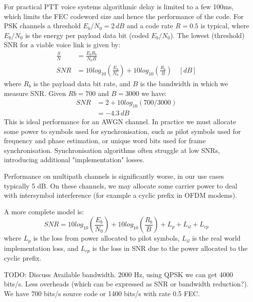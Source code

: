 \documentclass{article}
\begin{document}
For practical PTT voice systems algorithmic delay is limited to a few 100ms, which limits the FEC codeword size and hence the performance of the code.  For PSK channels a threshold $E_b/N_0=2 \, \si{dB}$ and a code rate $R=0.5$ is typical, where $E_b/N_0$ is the energy per payload data bit (coded $E_b/N_0$).  The lowest (threshold) SNR for a viable voice link is given by:
\begin{equation}
\label{eq:snr}
\begin{split}
\frac{S}{N} &= \frac{E_bR_b}{N_0B} \\
SNR &= 10log_{10}\left(\frac{E_b}{N_0}\right) + 10log_{10}\left(\frac{R_b}{B}\right) \quad [\si{dB}]
\end{split}
\end{equation}
where $R_b$ is the payload data bit rate, and $B$ is the bandwidth in which we measure SNR.  Given $Rb=700$ and $B=3000$ we have:
\begin{equation}
\begin{split}
SNR &= 2 + 10log_{10}(700/3000) \\
    &= -4.3 \, \si{dB}
\end{split}
\end{equation}
This is ideal performance for an AWGN channel.  In practice we must allocate some power to symbols used for synchronisation, such as pilot symbols used for frequency and phase estimation, or unique word bits used for frame synchronisation.  Synchronisation algorithms often struggle at low SNRs, introducing additional "implementation" losses.

Performance on multipath channels is significantly worse, in our use cases typically 5 dB.  On these channels, we may allocate some carrier power to deal with intersymbol interference (for example a cyclic prefix in OFDM modems).

A more complete model is:
\begin{equation}
\label{eq:snr_all}
SNR = 10log_{10}\left(\frac{E_b}{N_0}\right) + 10log_{10}\left(\frac{R_b}{B}\right) + L_p + L_{il} + L_{cp}
\end{equation}
where $L_p$ is the loss from power allocated to pilot symbols, $L_{il}$ is the real world implementation loss, and $L_{cp}$ is the loss in SNR due to the power allocated to the cyclic prefix.

TODO: Discuss Available bandwidth. 2000 Hz, using QPSK we can get 4000 bits/s.  Less overheads (which can be expressed as SNR or bandwidth reduction?).  We have 700 bits/s source code or 1400 bits/s with rate 0.5 FEC.
\end{document}

